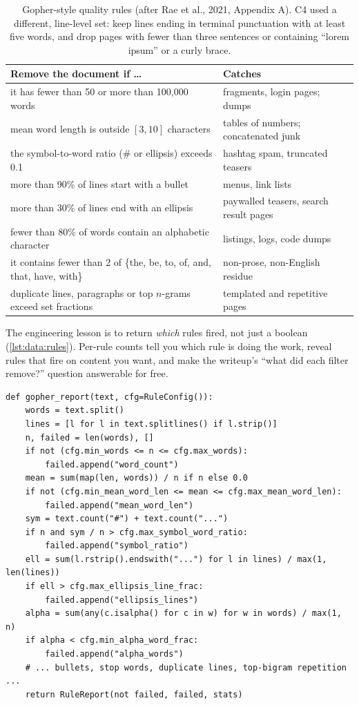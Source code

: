 \begin{table}[t]
\centering\small
\begin{tabularx}{\linewidth}{@{}Xl@{}}
\toprule
\textbf{Remove the document if \ldots} & \textbf{Catches}\\
\midrule
it has fewer than 50 or more than 100{,}000 words & fragments, login pages; dumps\\
mean word length is outside $[3,10]$ characters & tables of numbers; concatenated junk\\
the symbol-to-word ratio (\# or ellipsis) exceeds 0.1 & hashtag spam, truncated teasers\\
more than 90\% of lines start with a bullet & menus, link lists\\
more than 30\% of lines end with an ellipsis & paywalled teasers, search result pages\\
fewer than 80\% of words contain an alphabetic character & listings, logs, code dumps\\
it contains fewer than 2 of \{the, be, to, of, and, that, have, with\} & non-prose, non-English residue\\
duplicate lines, paragraphs or top $n$-grams exceed set fractions & templated and repetitive pages\\
\bottomrule
\end{tabularx}
\caption{Gopher-style quality rules (after Rae et al., 2021, Appendix A). C4 used a different,
line-level set: keep lines ending in terminal punctuation with at least five words, and drop pages
with fewer than three sentences or containing ``lorem ipsum'' or a curly brace.}
\label{tab:data:gopher}
\end{table}

The engineering lesson is to return \emph{which} rules fired, not just a boolean
(\cref{lst:data:rules}). Per-rule counts tell you which rule is doing the work, reveal rules that
fire on content you want, and make the writeup's ``what did each filter remove?'' question
answerable for free.

\begin{lstlisting}[caption={Gopher-style rules with a per-rule report (abridged from \code{llmsys/datapipe/rules.py}).},label={lst:data:rules}]
def gopher_report(text, cfg=RuleConfig()):
    words = text.split()
    lines = [l for l in text.splitlines() if l.strip()]
    n, failed = len(words), []
    if not (cfg.min_words <= n <= cfg.max_words):
        failed.append("word_count")
    mean = sum(map(len, words)) / n if n else 0.0
    if not (cfg.min_mean_word_len <= mean <= cfg.max_mean_word_len):
        failed.append("mean_word_len")
    sym = text.count("#") + text.count("...")
    if n and sym / n > cfg.max_symbol_word_ratio:
        failed.append("symbol_ratio")
    ell = sum(l.rstrip().endswith("...") for l in lines) / max(1, len(lines))
    if ell > cfg.max_ellipsis_line_frac:
        failed.append("ellipsis_lines")
    alpha = sum(any(c.isalpha() for c in w) for w in words) / max(1, n)
    if alpha < cfg.min_alpha_word_frac:
        failed.append("alpha_words")
    # ... bullets, stop words, duplicate lines, top-bigram repetition ...
    return RuleReport(not failed, failed, stats)
\end{lstlisting}

